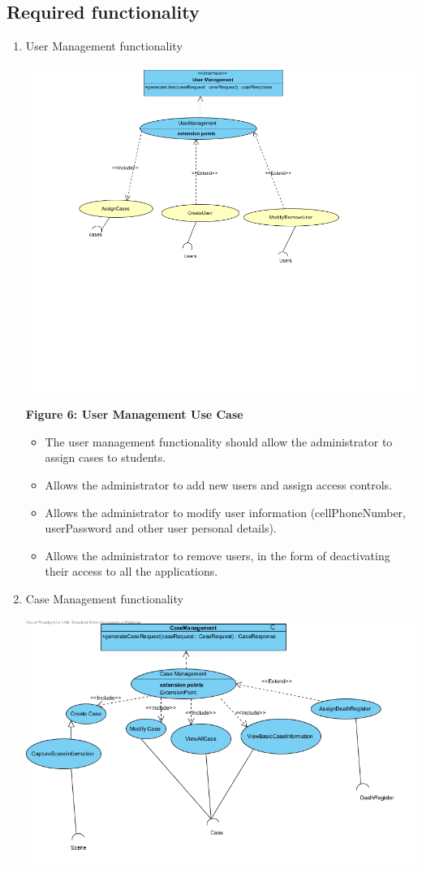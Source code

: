 \documentclass[10pt,a4paper]{article}
\begin{document}
\subsection{Required functionality}
\begin{enumerate}
	\item User Management functionality
	\begin{center}
		\includegraphics[scale=0.4]{UserManagementRequirementFunctionality.png}
		
		\textbf{Figure 6: User Management Use Case}
	\end{center}
	\begin{itemize}
		\item The user management functionality should allow the administrator to assign cases to students.
		\item Allows the administrator to add new users and assign access controls.
		\item Allows the administrator to modify user information (cellPhoneNumber, userPassword and other user personal details).
		\item Allows the administrator to remove users, in the form of deactivating their access to all the applications.
	\end{itemize}
	\item Case Management functionality
	\begin{center}
		\includegraphics[scale=0.4]{CaseManagementUseCase.png}
		

\end{center}
\end{enumerate}
\end{document}
